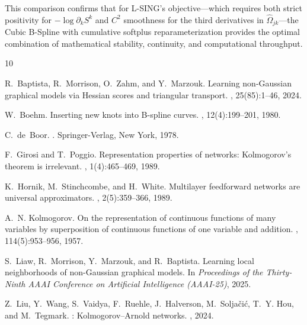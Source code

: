 \documentclass[11pt,a4paper]{article}
\theoremstyle{plain}
\theoremstyle{definition}
\theoremstyle{remark}
\begin{document}
This comparison confirms that for L-SING's objective—which requires both strict positivity for $-\log \partial_k S^k$ and $C^2$ smoothness for the third derivatives in $\hat{\Omega}_{jk}$—the Cubic B-Spline with cumulative softplus reparameterization provides the optimal combination of mathematical stability, continuity, and computational throughput.


\begin{thebibliography}{10}

R.~Baptista, R.~Morrison, O.~Zahm, and Y.~Marzouk.
\newblock Learning non-{G}aussian graphical models via {H}essian scores and triangular transport.
, 25(85):1--46, 2024.

W.~Boehm.
\newblock Inserting new knots into {B}-spline curves.
, 12(4):199--201, 1980.

C.~de~Boor.
.
\newblock Springer-Verlag, New York, 1978.

F.~Girosi and T.~Poggio.
\newblock Representation properties of networks: {K}olmogorov's theorem is irrelevant.
, 1(4):465--469, 1989.

K.~Hornik, M.~Stinchcombe, and H.~White.
\newblock Multilayer feedforward networks are universal approximators.
, 2(5):359--366, 1989.

A.~N. Kolmogorov.
\newblock On the representation of continuous functions of many variables by superposition of continuous functions of one variable and addition.
, 114(5):953--956, 1957.

S.~Liaw, R.~Morrison, Y.~Marzouk, and R.~Baptista.
\newblock Learning local neighborhoods of non-{G}aussian graphical models.
\newblock In {\em Proceedings of the Thirty-Ninth AAAI Conference on Artificial Intelligence (AAAI-25)}, 2025.

Z.~Liu, Y.~Wang, S.~Vaidya, F.~Ruehle, J.~Halverson, M.~Solja{\v{c}}i{\'c}, T.~Y. Hou, and M.~Tegmark.
: {K}olmogorov--{A}rnold networks.
, 2024.


\end{thebibliography}
\end{document}
